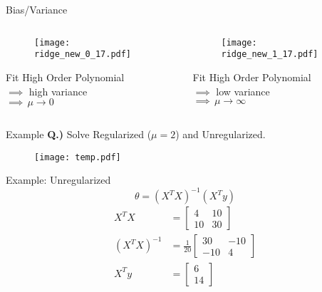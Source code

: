 \documentclass{beamer}
\begin{document}
\begin{frame}{Bias/Variance}
\begin{columns}
\begin{column}{0.4\textwidth}
\begin{figure}
\texttt{[image: ridge\_new\_0\_17.pdf]}
\end{figure}
Fit High Order Polynomial \\
$\implies$ high variance \\
$\implies \, \mu \rightarrow 0$
\end{column}
\begin{column}{0.4\textwidth}
\begin{figure}
\texttt{[image: ridge\_new\_1\_17.pdf]}
\end{figure}
Fit High Order Polynomial \\
$\implies$ low variance \\
$\implies \, \mu \rightarrow \infty$
\end{column}
\end{columns}
\end{frame}

\begin{frame}{Example}
\vspace{0.4cm}
\textbf{Q.)} Solve Regularized ($\mu = 2$) and Unregularized.
\vspace{-0.6cm}
\begin{figure}
\texttt{[image: temp.pdf]}
\end{figure}
\end{frame}

\begin{frame}{Example: Unregularized}
\[
\theta = (X^{T}X)^{-1}(X^{T}y)
\]
\pause
\begin{align*}
X^{T}X &= \begin{bmatrix}
4 &10\\10&30
\end{bmatrix} \\
(X^{T}X)^{-1} &= \frac{1}{20} \begin{bmatrix}
30 & -10\\
-10& 4
\end{bmatrix}\\
X^{T}y &= \begin{bmatrix}
6\\
14
\end{bmatrix}
\end{align*}
\end{frame}
\end{document}
